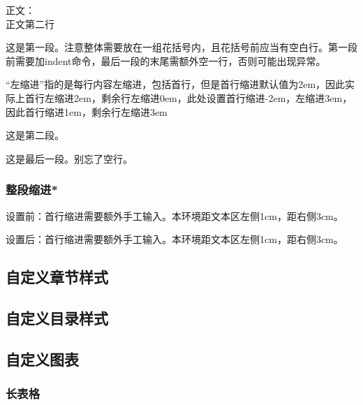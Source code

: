 \documentclass{ctexart}
\begin{document}
            正文：\\ %
            正文第二行\par %
            {\setlength{\parindent}{-2em} %
            \setlength{\leftskip}{3em} %
            这是第一段。注意整体需要放在一组花括号内，且花括号前应当有空白行。第一段前需要加indent命令，最后一段的末尾需额外空一行，否则可能出现异常。

            ``左缩进''指的是每行内容左缩进，包括首行，但是首行缩进默认值为2em，因此实际上首行左缩进2em，剩余行左缩进0em，此处设置首行缩进-2em，左缩进3em，因此首行缩进1em，剩余行左缩进3em

            这是第二段。

            这是最后一段。别忘了空行。\par
            }
            
        \subsubsection{整段缩进*}
            设置前：首行缩进需要额外手工输入。本环境距文本区左侧1cm，距右侧3cm。

            \begin{adjustwidth}{1cm}{3cm}
                \indent 设置后：首行缩进需要额外手工输入。本环境距文本区左侧1cm，距右侧3cm。
            \end{adjustwidth}

    \subsection{自定义章节样式}

    \subsection{自定义目录样式}

    \subsection{自定义图表}
        \subsubsection{长表格}
\end{document}
